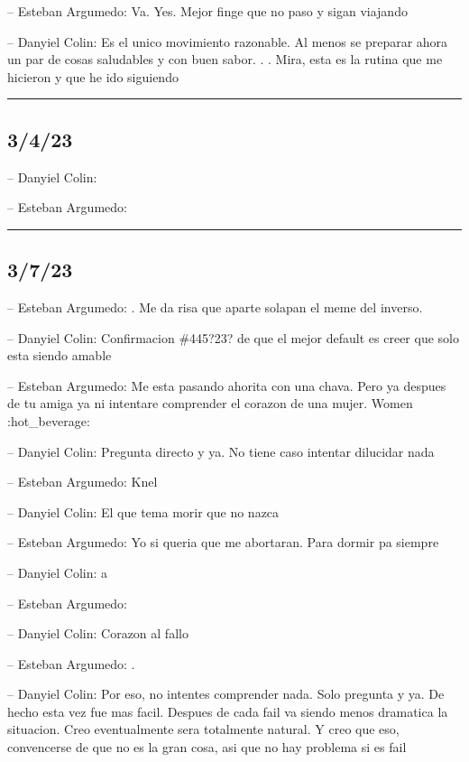 -- Esteban Argumedo: Va. Yes. Mejor finge que no paso y sigan viajando

-- Danyiel Colin: Es el unico movimiento razonable. Al menos se preparar
ahora un par de cosas saludables y con buen sabor. . . Mira, esta es la
rutina que me hicieron y que he ido siguiendo

\begin{center}\rule{0.5\linewidth}{0.5pt}\end{center}

\hypertarget{section-190}{%
\subsection{3/4/23}\label{section-190}}

-- Danyiel Colin:

-- Esteban Argumedo:

\begin{center}\rule{0.5\linewidth}{0.5pt}\end{center}

\hypertarget{section-191}{%
\subsection{3/7/23}\label{section-191}}

-- Esteban Argumedo: . Me da risa que aparte solapan el meme del
inverso.

-- Danyiel Colin: Confirmacion \#445?23? de que el mejor default es
creer que solo esta siendo amable

-- Esteban Argumedo: Me esta pasando ahorita con una chava. Pero ya
despues de tu amiga ya ni intentare comprender el corazon de una mujer.
Women :hot\_beverage:

-- Danyiel Colin: Pregunta directo y ya. No tiene caso intentar
dilucidar nada

-- Esteban Argumedo: Knel

-- Danyiel Colin: El que tema morir que no nazca

-- Esteban Argumedo: Yo si queria que me abortaran. Para dormir pa
siempre

-- Danyiel Colin: a

-- Esteban Argumedo:

-- Danyiel Colin: Corazon al fallo

-- Esteban Argumedo: .

-- Danyiel Colin: Por eso, no intentes comprender nada. Solo pregunta y
ya. De hecho esta vez fue mas facil. Despues de cada fail va siendo
menos dramatica la situacion. Creo eventualmente sera totalmente
natural. Y creo que eso, convencerse de que no es la gran cosa, asi que
no hay problema si es fail


